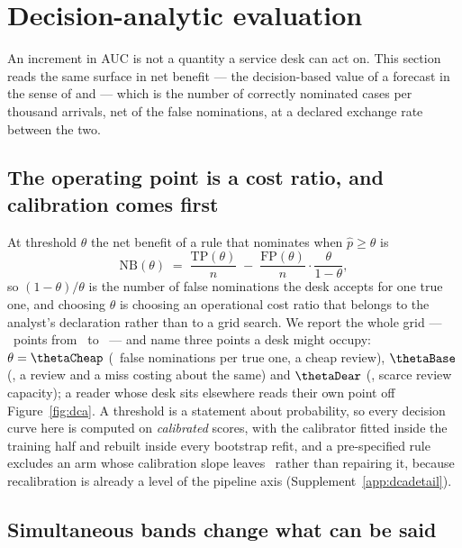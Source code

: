 
\section{Decision-analytic evaluation}
\label{sec:dca}

An increment in AUC is not a quantity a service desk can act on. This section
reads the same surface in net benefit --- the decision-based value of a
forecast in the sense of \citet{murphy1993good} and
\citet{granger2000economic} --- which is the number of correctly nominated
cases per thousand arrivals, net of the false nominations, at a declared
exchange rate between the two.

\subsection{The operating point is a cost ratio, and calibration comes first}
\label{sec:calibfirst}

At threshold $\theta$ the net benefit of a rule that nominates when
$\hat p \geq \theta$ is
\[
\mathrm{NB}(\theta) \;=\; \frac{\mathrm{TP}(\theta)}{n}
\;-\; \frac{\mathrm{FP}(\theta)}{n}\cdot\frac{\theta}{1-\theta},
\]
so $(1-\theta)/\theta$ is the number of false nominations the desk accepts
for one true one, and choosing $\theta$ is choosing an operational cost ratio
that belongs to the analyst's declaration rather than to a grid search. We
report the whole grid --- \nGrid\ points from \gridLo\ to \gridHi\ --- and
name three points a desk might occupy: $\theta = \thetaCheap$ (\ratioCheap\
false nominations per true one, a cheap review), $\thetaBase$ (\ratioBase, a
review and a miss costing about the same) and $\thetaDear$ (\ratioDear,
scarce review capacity); a reader whose desk sits elsewhere reads their own
point off Figure~\ref{fig:dca}. A threshold is a statement about
probability, so every decision curve here is computed on \emph{calibrated}
scores, with the calibrator fitted inside the training half and rebuilt
inside every bootstrap refit, and a pre-specified rule excludes an arm whose
calibration slope leaves \calSlopeWindow\ rather than repairing it, because
recalibration is already a level of the pipeline axis
(Supplement~\ref{app:dcadetail}).

\subsection{Simultaneous bands change what can be said}
\label{sec:dcabands}

